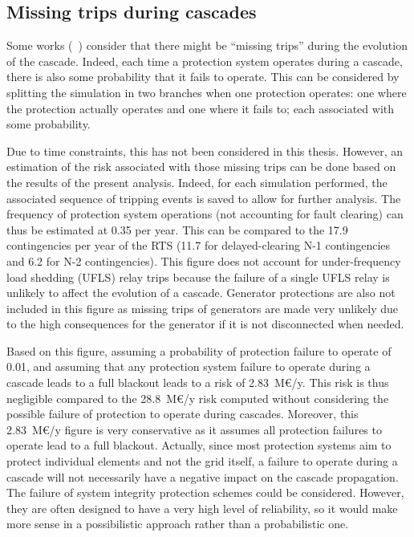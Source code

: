 \subsection{Missing trips during cascades}
\label{sec:PDSA_results_missing_trips}

Some works (\eg~\cite{Faghihi, DCATphase1}) consider that there might be ``missing trips'' during the evolution of the cascade. Indeed, each time a protection system operates during a cascade, there is also some probability that it fails to operate. This can be considered by splitting the simulation in two branches when one protection operates: one where the protection actually operates and one where it fails to; each associated with some probability.

Due to time constraints, this has not been considered in this thesis. However, an estimation of the risk associated with those missing trips can be done based on the results of the present analysis. Indeed, for each simulation performed, the associated sequence of tripping events is saved to allow for further analysis. The frequency of protection system operations (not accounting for fault clearing) can thus be estimated at 0.35 per year. This can be compared to the 17.9 contingencies per year of the RTS (11.7 for delayed-clearing N-1 contingencies and 6.2 for N-2 contingencies). This figure does not account for under-frequency load shedding (UFLS) relay trips because the failure of a single UFLS relay is unlikely to affect the evolution of a cascade. Generator protections are also not included in this figure as missing trips of generators are made very unlikely due to the high consequences for the generator if it is not disconnected when needed.

Based on this figure, assuming a probability of protection failure to operate of 0.01, and assuming that any protection system failure to operate during a cascade leads to a full blackout leads to a risk of 2.83~M€/y. This risk is thus negligible compared to the 28.8~M€/y risk computed without considering the possible failure of protection to operate during cascades. Moreover, this 2.83~M€/y figure is very conservative as it assumes all protection failures to operate lead to a full blackout. Actually, since most protection systems aim to protect individual elements and not the grid itself, a failure to operate during a cascade will not necessarily have a negative impact on the cascade propagation. The failure of system integrity protection schemes could be considered. However, they are often designed to have a very high level of reliability, so it would make more sense in a possibilistic approach rather than a probabilistic one.

